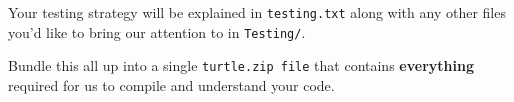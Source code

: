 \begin{exercise}
Your testing strategy will be explained in \verb^testing.txt^ along with any other files you'd like to bring our attention to in \verb^Testing/^.

Bundle this all up into a single \verb^turtle.zip file^ that contains {\bf everything} required
for us to compile and understand your code.

\end{exercise}

